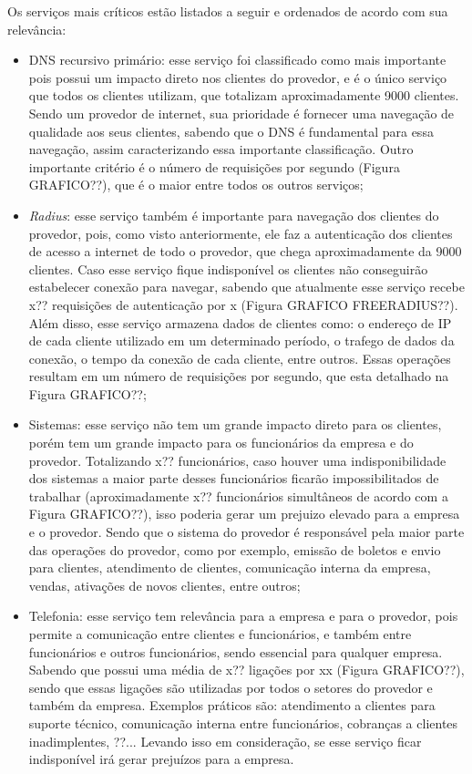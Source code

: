 Os serviços mais críticos estão listados a seguir e ordenados de acordo com sua relevância:
\begin{itemize}
 \item \ac{DNS} recursivo primário: esse serviço foi classificado como mais importante pois possui um impacto direto nos clientes do provedor, e 
 é o único serviço que todos os clientes utilizam, que totalizam aproximadamente 9000 clientes. Sendo um provedor de internet, sua prioridade é 
 fornecer uma navegação de qualidade aos seus clientes, sabendo que o \ac{DNS} é fundamental para essa navegação, assim caracterizando essa 
 importante classificação. Outro importante critério é o número de requisições por segundo (Figura GRAFICO??), que é o maior entre todos os 
 outros serviços;
 
 \item \textit{Radius}: esse serviço também é importante para navegação dos clientes do provedor, pois, como visto anteriormente, ele faz a
 autenticação dos clientes de acesso a internet de todo o provedor, que chega aproximadamente da 9000 clientes. Caso esse serviço fique 
 indisponível os clientes não conseguirão estabelecer conexão para navegar, sabendo que atualmente esse serviço recebe x?? requisições de
 autenticação por x (Figura GRAFICO FREERADIUS??). Além disso, esse serviço armazena dados de clientes como: o endereço de \ac{IP} de cada 
 cliente utilizado em um determinado período, o trafego de dados da conexão, o tempo da conexão de cada cliente, entre outros. 
 Essas operações resultam em um número de requisições por segundo, que esta detalhado na Figura GRAFICO??;
 
 \item Sistemas: esse serviço não tem um grande impacto direto para os clientes, porém tem um grande impacto para os funcionários da empresa e 
 do provedor. Totalizando x?? funcionários, caso houver uma indisponibilidade dos sistemas a maior parte desses funcionários ficarão 
 impossibilitados de trabalhar (aproximadamente x?? funcionários simultâneos de acordo com a Figura GRAFICO??), isso poderia gerar um prejuizo 
 elevado para a empresa e o provedor. Sendo que o sistema do provedor é responsável pela maior parte das operações do provedor, 
 como por exemplo, emissão de boletos e envio para clientes, atendimento de clientes, comunicação interna da empresa, vendas, 
 ativações de novos clientes, entre outros;
 
 \item Telefonia: esse serviço tem relevância para a empresa e para o provedor, pois permite a comunicação entre clientes e funcionários, 
 e também entre funcionários e outros funcionários, sendo essencial para qualquer empresa. Sabendo que possui uma média de x?? ligações por xx
 (Figura GRAFICO??), sendo que essas ligações são utilizadas por todos o setores do provedor e também da empresa. Exemplos práticos são: 
 atendimento a clientes para suporte técnico, comunicação interna entre funcionários, cobranças a clientes inadimplentes, ??... 
 Levando isso em consideração, se esse serviço ficar indisponível irá gerar prejuízos para a empresa.
\end{itemize}

